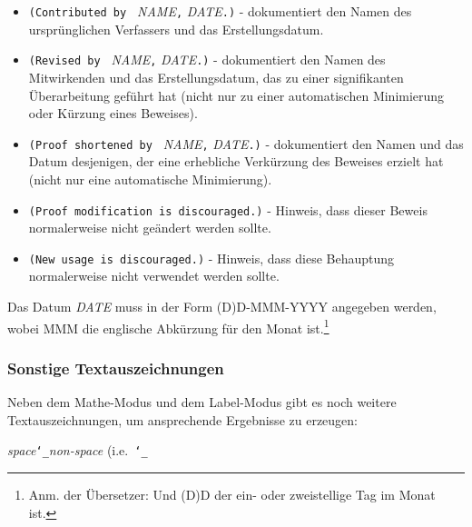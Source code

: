 \begin{itemize}
 \item[] \texttt{(Contributed by }
   \textit{NAME}\texttt{,} \textit{DATE}\texttt{.)} -
   dokumentiert den Namen des ursprünglichen Verfassers und das Erstellungsdatum.
 \item[] \texttt{(Revised by }
   \textit{NAME}\texttt{,} \textit{DATE}\texttt{.)} -
   dokumentiert den Namen des Mitwirkenden und das Erstellungsdatum, das zu einer signifikanten Überarbeitung geführt hat (nicht nur zu einer automatischen Minimierung oder Kürzung eines Beweises).
 \item[] \texttt{(Proof shortened by }
   \textit{NAME}\texttt{,} \textit{DATE}\texttt{.)} -
   dokumentiert den Namen und das Datum desjenigen, der eine erhebliche Verkürzung des Beweises erzielt hat (nicht nur eine automatische Minimierung).
 \item[] \texttt{(Proof modification is discouraged.)} -
   Hinweis, dass dieser Beweis normalerweise nicht geändert werden sollte.
 \item[] \texttt{(New usage is discouraged.)} -
   Hinweis, dass diese Behauptung normalerweise nicht verwendet werden sollte.
\end{itemize}

Das Datum \textit{DATE} muss in der Form (D)D-MMM-YYYY angegeben werden, wobei MMM die englische Abkürzung für den Monat ist.\footnote{Anm. der Übersetzer: Und (D)D der ein- oder zweistellige Tag im Monat ist.}

\subsubsection{Sonstige Textauszeichnungen}\label{othermarkup}

Neben dem Mathe-Modus und dem Label-Modus gibt es noch weitere Textauszeichnungen, um ansprechende Ergebnisse zu erzeugen:


 {\em space}\texttt{\char`\_}{\em non-space} (i.e.\ \texttt{\char`\_}
 
